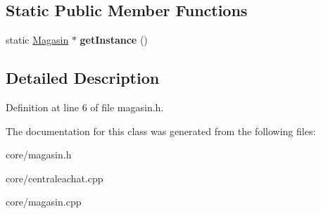 \subsection*{Static Public Member Functions}
\begin{DoxyCompactItemize}
\item 
\hypertarget{class_magasin_a4fbd03ebbe5e0b6918d989d9f69ab649}{
static \hyperlink{class_magasin}{Magasin} $\ast$ {\bfseries getInstance} ()}
\label{d6/dbb/class_magasin_a4fbd03ebbe5e0b6918d989d9f69ab649}

\end{DoxyCompactItemize}


\subsection{Detailed Description}


Definition at line 6 of file magasin.h.



The documentation for this class was generated from the following files:\begin{DoxyCompactItemize}
\item 
core/magasin.h\item 
core/centraleachat.cpp\item 
core/magasin.cpp\end{DoxyCompactItemize}
